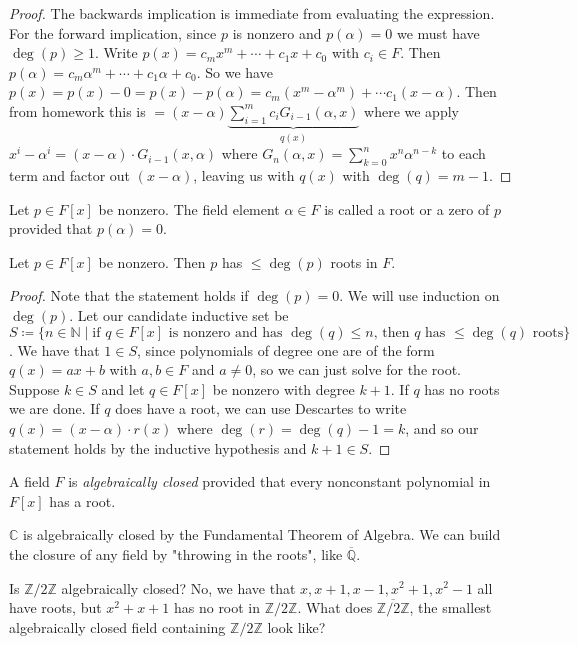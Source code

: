 \begin{proof}
    The backwards implication is immediate from evaluating the expression. For the forward implication, since \(p\) is nonzero and \(p(\alpha )=0\) we must have \(\deg(p)\geq 1\). Write \(p(x)=c_m x^m + \cdots + c_1 x + c_0\) with \(c_i \in F\). Then \(p(\alpha )=c_m \alpha^m + \cdots + c_1 \alpha + c_0\). So we have \(p(x) = p(x)-0 = p(x)-p(\alpha ) = c_m(x^m - \alpha ^m) + \cdots c_1 (x-\alpha )\). Then from homework this is \(=(x-\alpha )\underbrace{\sum_{i=1}^{m} c_i G_{i-1}(\alpha ,x)}_{q(x)}  \)  where we apply \(x^i - \alpha ^i = (x-\alpha ) \cdot  G_{i-1}(x,\alpha ) \) where \(G_{n} (\alpha ,x)= \sum_{k=0}^{n} x^n \alpha ^{n -k} \) to each term and factor out \((x-\alpha )\), leaving us with \(q(x)\) with \(\deg(q)=m-1\).
\end{proof}
\begin{definition}
    Let \(p \in F[x]\) be nonzero. The field element \(\alpha \in F\) is called a root or a zero of \(p\) provided that \(p(\alpha )= 0\).
\end{definition}
\begin{corollary}
    Let \(p \in F[x]\) be nonzero. Then \(p\) has \(\leq \deg(p)\) roots in \(F\).   
\end{corollary}
\begin{proof}
    Note that the statement holds if \(\deg(p)=0\). We will use induction on \(\deg(p)\). Let our candidate inductive set be \(S\coloneqq \{ n \in \mathbb{N} \mid \text{if } q \in F[x] \text{ is nonzero and has } \deg(q)\leq n \text{, then } q \text{ has } \leq \deg(q) \text{ roots}\} \). We have that \(1 \in S\), since polynomials of degree one are of the form \(q(x)=ax+b\) with \(a, b \in F\) and \(a \neq 0\), so we can just solve for the root. Suppose \(k \in S\) and let \(q \in F[x]\) be nonzero with degree \(k+1\). If \(q\) has no roots we are done. If \(q\) does have a root, we can use Descartes to write \(q(x) = (x-\alpha )\cdot r(x)\) where \(\deg(r) = \deg(q)-1 =k\), and so our statement holds by the inductive hypothesis and \(k+1 \in S\).
\end{proof}
\begin{lingo}
    A field \(F\) is \emph{algebraically closed} provided that every nonconstant polynomial in \(F[x]\) has a root.   
\end{lingo}
\begin{remark}
    \(\mathbb{C} \) is algebraically closed by the Fundamental Theorem of Algebra. We can build the closure of any field by "throwing in the roots", like \(\overline{\mathbb{Q}} \).
\end{remark}
\begin{eg}
	Is \(\mathbb{Z} /2\mathbb{Z} \) algebraically closed? No, we have that \(x, x+1, x-1, x^2 +1, x^2 -1\) all have roots, but \(x^2 +x+1\) has no root in \(\mathbb{Z} /2\mathbb{Z} \). What does \(\overline{\mathbb{Z} /2\mathbb{Z} } \), the smallest algebraically closed field containing \(\mathbb{Z} /2\mathbb{Z} \) look like?     
\end{eg}